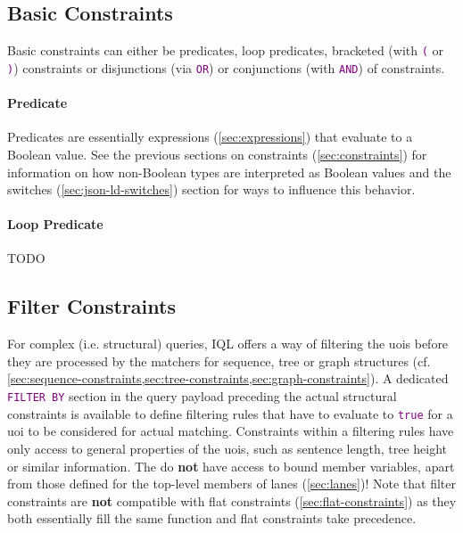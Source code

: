 \documentclass[11pt,a4paper,portrait]{article}
\newcommand{\iql}{IQL\xspace}
\newcommand{\keyword}[1]{\textcolor{purple}{\texttt{#1}}}
\begin{document}
\subsection{Basic Constraints}
\label{sec:basic-constraints}

Basic constraints can either be predicates, loop predicates, bracketed (with \keyword{(} or \keyword{)}) constraints or disjunctions (via \keyword{OR}) or conjunctions (with \keyword{AND}) of constraints.

\paragraph{Predicate}
\label{sec:predicate}

Predicates are essentially expressions (\ref{sec:expressions}) that evaluate to a Boolean value. 
See the previous sections on constraints (\ref{sec:constraints}) for information on how non-Boolean types are interpreted as Boolean values and the switches (\ref{sec:json-ld-switches}) section for ways to influence this behavior.

\paragraph{Loop Predicate}

TODO

\subsection{Filter Constraints}
\label{sec:filter-constraints}

For complex (i.e. structural) queries, \iql offers a way of filtering the \acp{uoi} before they are processed by the matchers for sequence, tree or graph structures (cf. \cref{sec:sequence-constraints,sec:tree-constraints,sec:graph-constraints}).
A dedicated \keyword{FILTER BY} section in the query payload preceding the actual structural constraints is available to define filtering rules that have to evaluate to \keyword{true} for a \ac{uoi} to be considered for actual matching.
Constraints within a filtering rules have only access to general properties of the \acp{uoi}, such as sentence length, tree height or similar information.
The do \textbf{not} have access to bound member variables, apart from those defined for the top-level members of lanes (\ref{sec:lanes})!
Note that filter constraints are \textbf{not} compatible with flat constraints (\ref{sec:flat-constraints}) as they both essentially fill the same function and flat constraints take precedence.
\end{document}
